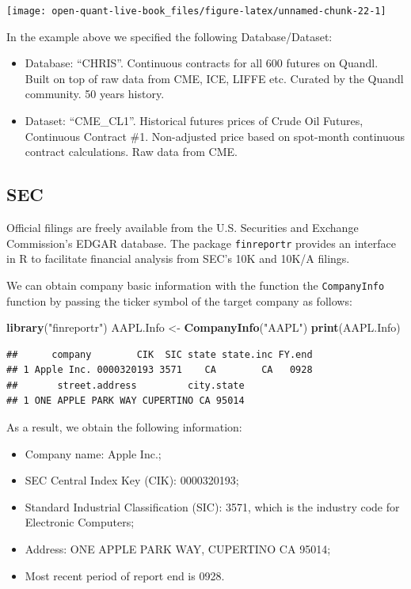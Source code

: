 \documentclass[]{book}
\newenvironment{Shaded}{\begin{snugshade}}{\end{snugshade}}
\newcommand{\KeywordTok}[1]{\textcolor[rgb]{0.13,0.29,0.53}{\textbf{#1}}}
\newcommand{\StringTok}[1]{\textcolor[rgb]{0.31,0.60,0.02}{#1}}
\newcommand{\NormalTok}[1]{#1}
\providecommand{\tightlist}{%
  \setlength{\itemsep}{0pt}\setlength{\parskip}{0pt}}
\theoremstyle{definition}
\theoremstyle{definition}
\theoremstyle{definition}
\theoremstyle{remark}
\begin{document}
\begin{center}\texttt{[image: open-quant-live-book\_files/figure-latex/unnamed-chunk-22-1]} \end{center}

In the example above we specified the following Database/Dataset:

\begin{itemize}
\tightlist
\item
  Database: ``CHRIS''. Continuous contracts for all 600 futures on
  Quandl. Built on top of raw data from CME, ICE, LIFFE etc. Curated by
  the Quandl community. 50 years history.
\item
  Dataset: ``CME\_CL1''. Historical futures prices of Crude Oil Futures,
  Continuous Contract \#1. Non-adjusted price based on spot-month
  continuous contract calculations. Raw data from CME.
\end{itemize}

\subsection{SEC}\label{sec}

Official filings are freely available from the U.S. Securities and
Exchange Commission's EDGAR database. The package \texttt{finreportr}
provides an interface in R to facilitate financial analysis from SEC's
10K and 10K/A filings.

We can obtain company basic information with the function the
\texttt{CompanyInfo} function by passing the ticker symbol of the target
company as follows:

\begin{Shaded}
\begin{Highlighting}[]
\KeywordTok{library}\NormalTok{(}\StringTok{"finreportr"}\NormalTok{)}
\NormalTok{AAPL.Info <-}\StringTok{ }\KeywordTok{CompanyInfo}\NormalTok{(}\StringTok{"AAPL"}\NormalTok{)}
\KeywordTok{print}\NormalTok{(AAPL.Info)}
\end{Highlighting}
\end{Shaded}

\begin{verbatim}
##      company        CIK  SIC state state.inc FY.end
## 1 Apple Inc. 0000320193 3571    CA        CA   0928
##       street.address         city.state
## 1 ONE APPLE PARK WAY CUPERTINO CA 95014
\end{verbatim}

As a result, we obtain the following information:

\begin{itemize}
\tightlist
\item
  Company name: Apple Inc.;
\item
  SEC Central Index Key (CIK): 0000320193;
\item
  Standard Industrial Classification (SIC): 3571, which is the industry
  code for Electronic Computers;
\item
  Address: ONE APPLE PARK WAY, CUPERTINO CA 95014;
\item
  Most recent period of report end is 0928.
\end{itemize}
\end{document}
